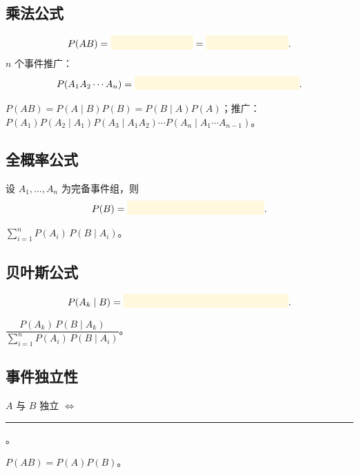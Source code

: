 \documentclass[11pt,a4paper]{article}
\newcommand{\blankbox}[1]{%
  \textcolor{blankyellow}{\rule[-0.1cm]{#1}{0.5cm}}%
}
\begin{document}
\subsection{乘法公式}

\begin{formulabox}[乘法公式]
\[P(AB) = \blankbox{3cm} = \blankbox{3cm}.\]
$n$ 个事件推广：
\[P(A_1 A_2\cdots A_n) = \blankbox{6cm}.\]
\end{formulabox}

\begin{answerbox}
$P(AB)=P(A\mid B)P(B)=P(B\mid A)P(A)$；推广：$P(A_1)P(A_2\mid A_1)P(A_3\mid A_1A_2)\cdots P(A_n\mid A_1\cdots A_{n-1})$。
\end{answerbox}

\subsection{全概率公式}

\begin{formulabox}[全概率公式]
设 $A_1,\dots,A_n$ 为完备事件组，则
\[P(B) = \blankbox{5cm}.\]
\end{formulabox}

\begin{answerbox}
$\displaystyle\sum_{i=1}^{n} P(A_i)\,P(B\mid A_i)$。
\end{answerbox}

\subsection{贝叶斯公式}

\begin{formulabox}[贝叶斯公式]
\[P(A_k\mid B) = \blankbox{6cm}.\]
\end{formulabox}

\begin{answerbox}
$\dfrac{P(A_k)\,P(B\mid A_k)}{\displaystyle\sum_{i=1}^{n} P(A_i)\,P(B\mid A_i)}$。
\end{answerbox}

\subsection{事件独立性}

\begin{formulabox}[事件独立性]
$A$ 与 $B$ 独立 $\iff$ \blankbox{3cm}。
\end{formulabox}

\begin{answerbox}
$P(AB)=P(A)P(B)$。
\end{answerbox}
\end{document}

